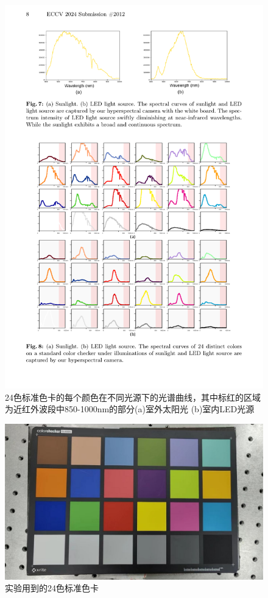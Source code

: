 \documentclass[
    type = master, %
    degree = academic,        %
    decl-page,  %
  ]{njuthesis}
\begin{document}
\begin{figure}[h]
	\centering
	\includegraphics[width=1.0\linewidth]{docs/fig-chap3/fig-3-colorchecker-curve.pdf}
	\caption{24色标准色卡的每个颜色在不同光源下的光谱曲线，其中标红的区域为近红外波段中850-1000nm的部分\quad (a)室外太阳光 \quad (b)室内LED光源}
	\label{fig:colorchekcer curve}
\end{figure}

\begin{figure}[h]
	\centering
	\includegraphics[width=1.0\linewidth]{docs/fig-chap3/fig-3-colorchecker.pdf}
	\caption{实验用到的24色标准色卡}
	\label{fig:colorchekcer}
\end{figure}
\end{document}
